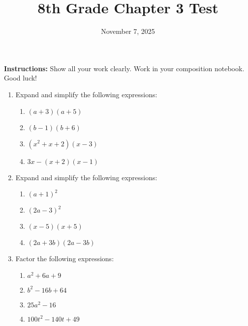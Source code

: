 \documentclass[12pt]{article}
\title{8th Grade Chapter 3 Test}
\date{November 7, 2025}
\begin{document}
\maketitle

\textbf{Instructions:} Show all your work clearly. Work in your composition notebook. Good luck!

\begin{enumerate}
    \item Expand and simplify the following expressions:
    \begin{enumerate}
        \item $(a+3)(a+5)$
        \item $(b-1)(b+6)$
        \item $(x^2+x+2)(x-3)$
        \item $3x - (x+2)(x-1)$
    \end{enumerate}
    \item Expand and simplify the following expressions:
    \begin{enumerate}
        \item $(a+1)^2$
        \item $(2a-3)^2$
        \item $(x-5)(x+5)$
        \item $(2a+3b)(2a-3b)$
    \end{enumerate}
    \item Factor the following expressions:
    \begin{enumerate}
        \item $a^2+6a+9$
        \item $b^2-16b+64$
        \item $25a^2 - 16$
        \item $100t^2 - 140t + 49$
    \end{enumerate}
\end{enumerate}
\end{document}
